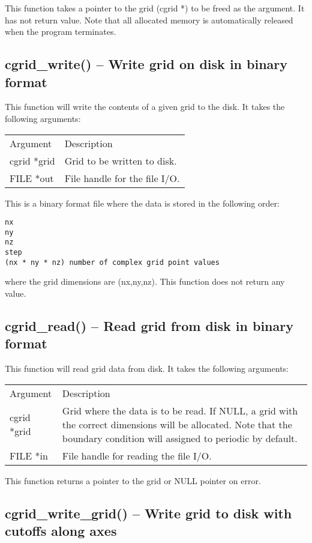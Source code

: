 \documentclass[12pt,letterpaper]{report}
\begin{document}
This function takes a pointer to the grid (cgrid *) to be freed as the argument. It has not return value. Note that all allocated memory is automatically released when the program terminates.

\subsection{cgrid\_write() -- Write grid on disk in binary format}

This function will write the contents of a given grid to the disk. It takes the following arguments:
\begin{longtable}{p{} p{}}
Argument & Description\\
\cline{1-2}
cgrid *grid & Grid to be written to disk.\\
FILE *out & File handle for the file I/O.\\
\end{longtable}
\noindent
This is a binary format file where the data is stored in the following order:
\begin{verbatim}
nx
ny
nz
step
(nx * ny * nz) number of complex grid point values
\end{verbatim}
where the grid dimensions are (nx,ny,nz). This function does not return any value.

\subsection{cgrid\_read() -- Read grid from disk in binary format}

This function will read grid data from disk. It takes the following arguments:
\begin{longtable}{p{} p{}}
Argument & Description\\
\cline{1-2}
cgrid *grid & Grid where the data is to be read. If NULL, a grid with the correct dimensions will be allocated. Note that the boundary condition will assigned to periodic by default.\\
FILE *in & File handle for reading the file I/O.\\
\end{longtable}
This function returns a pointer to the grid or NULL pointer on error.

\subsection{cgrid\_write\_grid() -- Write grid to disk with cutoffs along axes}
\end{document}

